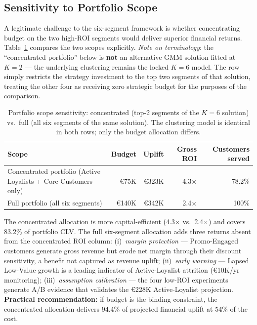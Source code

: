 \documentclass[10pt,a4paper]{article}
\newcommand{\eur}{€}
\begin{document}
\subsection{Sensitivity to Portfolio Scope}
\label{ssec:scope}

A legitimate challenge to the six-segment framework is whether concentrating budget
on the two high-ROI segments would deliver superior financial returns.
Table~\ref{tab:scope} compares the two scopes explicitly. \emph{Note on terminology}:
the ``concentrated portfolio'' below is \textbf{not} an alternative GMM solution
fitted at $K{=}2$ --- the underlying clustering remains the locked $K{=}6$ model.
The row simply restricts the strategy investment to the top two segments of that
solution, treating the other four as receiving zero strategic budget for the
purposes of the comparison.

\begin{table}[H]
\centering\small
\caption{Portfolio scope sensitivity: concentrated (top-2 segments of the $K{=}6$
solution) vs.\ full (all six segments of the same solution). The clustering model
is identical in both rows; only the budget allocation differs.}
\label{tab:scope}
\begin{tabular}{@{}lrrrr@{}}
\toprule
\textbf{Scope} & \textbf{Budget} & \textbf{Uplift} & \textbf{Gross ROI}
  & \textbf{Customers served} \\
\midrule
Concentrated portfolio (Active Loyalists + Core Customers only)
  & \eur75K  & \eur323K & 4.3$\times$ & 78.2\% \\
Full portfolio (all six segments)
  & \eur140K & \eur342K & 2.4$\times$ & 100\%  \\
\bottomrule
\end{tabular}
\end{table}

The concentrated allocation is more capital-efficient (4.3$\times$ vs.\ 2.4$\times$)
and covers 83.2\% of portfolio CLV. The full six-segment allocation adds three
returns absent from the concentrated ROI column: (i)~\textit{margin protection} ---
Promo-Engaged customers generate gross revenue but erode net margin through their
discount sensitivity, a benefit not captured as revenue uplift;
(ii)~\textit{early warning} --- Lapsed Low-Value growth is a leading indicator of
Active-Loyalist attrition (\eur10K/yr monitoring); (iii)~\textit{assumption
calibration} --- the four low-ROI experiments generate A/B evidence that validates
the \eur228K Active-Loyalist projection. \textbf{Practical recommendation:} if budget
is the binding constraint, the concentrated allocation delivers 94.4\% of projected
financial uplift at 54\% of the cost.
\end{document}
